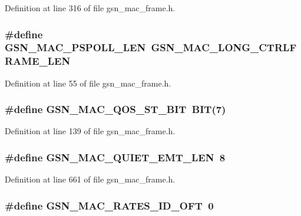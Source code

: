 Definition at line 316 of file gsn\_\-mac\_\-frame.h.

\hypertarget{a00523_ac346c12dcdf47dc4cea4787c23f0223b}{
\subsubsection[{GSN\_\-MAC\_\-PSPOLL\_\-LEN}]{\setlength{\rightskip}{0pt plus 5cm}\#define GSN\_\-MAC\_\-PSPOLL\_\-LEN~GSN\_\-MAC\_\-LONG\_\-CTRLFRAME\_\-LEN}}
\label{a00523_ac346c12dcdf47dc4cea4787c23f0223b}


Definition at line 55 of file gsn\_\-mac\_\-frame.h.

\hypertarget{a00523_a523e458cbc29e70edf1bd06795ee2920}{
\subsubsection[{GSN\_\-MAC\_\-QOS\_\-ST\_\-BIT}]{\setlength{\rightskip}{0pt plus 5cm}\#define GSN\_\-MAC\_\-QOS\_\-ST\_\-BIT~BIT(7)}}
\label{a00523_a523e458cbc29e70edf1bd06795ee2920}


Definition at line 139 of file gsn\_\-mac\_\-frame.h.

\hypertarget{a00523_ab647f722b5261c8ab6b5842c5ec8b2df}{
\subsubsection[{GSN\_\-MAC\_\-QUIET\_\-EMT\_\-LEN}]{\setlength{\rightskip}{0pt plus 5cm}\#define GSN\_\-MAC\_\-QUIET\_\-EMT\_\-LEN~8}}
\label{a00523_ab647f722b5261c8ab6b5842c5ec8b2df}


Definition at line 661 of file gsn\_\-mac\_\-frame.h.

\hypertarget{a00523_a5c10f5090b57c08263ce16389c3cb330}{
\subsubsection[{GSN\_\-MAC\_\-RATES\_\-ID\_\-OFT}]{\setlength{\rightskip}{0pt plus 5cm}\#define GSN\_\-MAC\_\-RATES\_\-ID\_\-OFT~0}}
\label{a00523_a5c10f5090b57c08263ce16389c3cb330}


